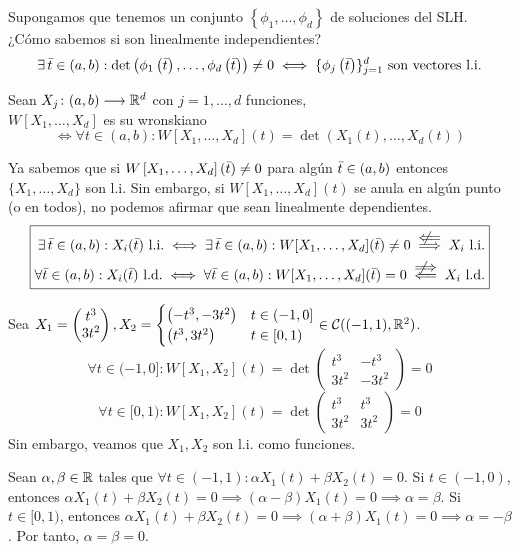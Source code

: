Supongamos que tenemos un conjunto $\left\{\phi_1, \dots, \phi_d\right\}$ de soluciones del SLH. ¿Cómo sabemos si son linealmente independientes?
\[\exists \, \Bar{t} \in (a,b) : \det{\left(\phi_1\left(\Bar{t}\right), \dots, \phi_d\left(\Bar{t}\right)\right)} \neq 0 \iff \{\phi_j\left(\Bar{t}\right)\}_{j=1}^d\text{ son vectores l.i.}\]

\begin{defn}[Wronskiano]
	Sean $X_j \colon (a,b) \longrightarrow \mathbb{R}^d$ con $j=1, \dots, d$ funciones, \\ $W\left[X_1, \dots, X_d\right]$ es su wronskiano
	\[\iff \forall t \in (a,b) : W\left[X_1, \dots, X_d\right](t) = \det{\left(X_1(t), \dots, X_d(t)\right)}\]
\end{defn}

Ya sabemos que si $W\left[X_1, \dots, X_d\right](\Bar{t}) \neq 0$ para algún $\Bar{t}\in(a,b)$ entonces $\{X_1, \dots, X_d\}$ son l.i. Sin embargo, si $W\left[X_1, \dots, X_d\right](t)$ se anula en algún punto (o en todos), no podemos afirmar que sean linealmente dependientes.
\[\boxed{\begin{aligned}
			\exists \, \Bar{t} \in (a,b) : X_i(\Bar{t}) \tex{ l.i.} \iff \exists \, \Bar{t} \in (a,b) : W[X_1, \dots, X_d](\Bar{t}) \ne 0 \stackrel{\nimpliedby}{\implies} X_i \tex{ l.i.} \\
			\forall \Bar{t} \in (a,b) : X_i(\Bar{t}) \tex{ l.d.}\iff \forall \Bar{t} \in (a, b) : W[X_1, \dots, X_d](\Bar{t}) = 0 \stackrel{\nimplies}{\impliedby} X_i \tex{ l.d.}
		\end{aligned}}\]

\begin{ejem}
	Sea $X_1 = \begin{pmatrix}
			t^3 \\
			3t^2
		\end{pmatrix}, X_2 = \begin{cases}
			\left(-t^3, -3t^2\right) & t \in (-1, 0] \\
			\left(t^3, 3t^2\right)   & t \in [0, 1)
		\end{cases} \in \mathcal{C}((-1, 1), \mathbb{R}^2)$.
	\[\forall t \in (-1, 0] : W\left[X_1, X_2\right](t) = \det{\begin{pmatrix}
					t^3  & -t^3  \\
					3t^2 & -3t^2
				\end{pmatrix}} = 0\]
		\[\forall t \in [0, 1) : W\left[X_1, X_2\right](t) = \det{\begin{pmatrix}
				t^3  & t^3  \\
				3t^2 & 3t^2
			\end{pmatrix}} = 0\]
	Sin embargo, veamos que $X_1, X_2$ son l.i. como funciones.

	Sean $\alpha, \beta \in \mathbb{R}$ tales que $\forall t \in (-1, 1) :\alpha X_1(t) + \beta X_2(t) = 0$. Si $t \in (-1, 0)$, entonces $\alpha X_1(t) + \beta X_2(t) = 0 \implies (\alpha - \beta)X_1(t) = 0 \implies \alpha = \beta$. Si $t \in [0, 1)$, entonces $\alpha X_1(t) + \beta X_2(t) = 0 \implies (\alpha + \beta)X_1(t) = 0 \implies \alpha = -\beta$. Por tanto, $\alpha = \beta = 0$.
\end{ejem}

